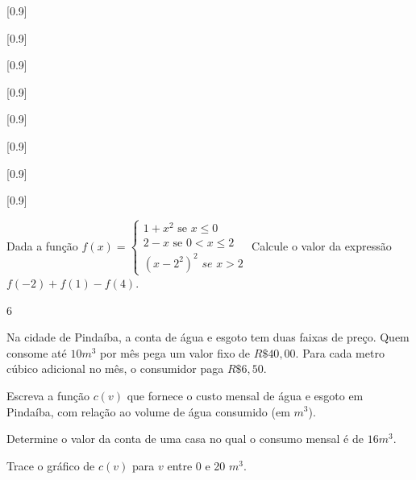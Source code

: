 \begin{exercises*}
\begin{exercise}
  \begin{answer}
    \begin{alphalist}
      \item {}[0.9]
      \item {}[0.9]
      \item {}[0.9]
      \item {}[0.9]
      \item {}[0.9]
      \item {}[0.9]
      \item {}[0.9]
      \item {}[0.9]
    \end{alphalist}
  \end{answer}
\end{exercise}

\begin{exercise}
  Dada a função $f(x)=\left\{\begin{array}{cc} 1+x^2 \text{ se } x \leq
      0\\
      2-x \text{ se } 0 < x \leq 2 \\
      (x-2^2)^2  \,\,se \,\,  x> 2
      \end{array}\right.$
  Calcule o valor da expressão $f(-2)+f(1)-f(4)$.

  \begin{answer}
    6
  \end{answer}
\end{exercise}

\begin{exercise}
  Na cidade de Pindaíba, a conta de água e esgoto tem duas faixas de preço.
  Quem consome até $10 m^3$ por mês pega um valor fixo de $R\$ 40,00$.
  Para cada metro cúbico adicional no mês, o consumidor paga $R\$6,50$.
  \begin{alphalist}
    \item Escreva a função $c(v)$ que fornece o custo mensal de água e esgoto
          em Pindaíba, com relação ao volume de água consumido (em $m^3$).
    \item Determine o valor da conta de uma casa no qual o consumo mensal
          é de $16m^3$.
    \item Trace o gráfico de $c(v)$ para $v$ entre 0 e 20 $m^3$.
  \end{alphalist}


\end{exercise}
\end{exercises*}
